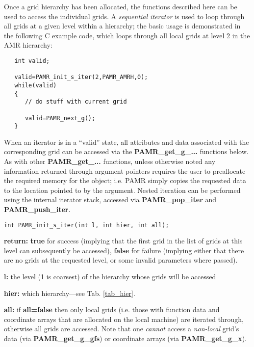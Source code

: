\documentclass[aps,amssymb,unsortedaddress,nofootinbib]{revtex4}
\def\lsep{\itemsep 0.05in}
\begin{document}
Once a grid hierarchy has been allocated, the functions described here can be used
to access the individual grids. A {\em sequential iterator} is used to loop
through all grids at a given level within a hierarchy; the basic usage is
demonstrated in the following C example code, which loops through all local grids
at level 2 in the AMR hierarchy:
\begin{verbatim}
   int valid;

   valid=PAMR_init_s_iter(2,PAMR_AMRH,0);
   while(valid)
   {
      // do stuff with current grid  
     
      valid=PAMR_next_g();
   }
\end{verbatim}
When an iterator is in a ``valid'' state, all attributes and data associated with the
corresponding grid can be accessed via the {\bf PAMR\_get\_g\_...} functions below.
As with other {\bf PAMR\_get\_...} functions, unless otherwise noted any
information returned through argument pointers requires the user to 
preallocate the required memory for the object; i.e. PAMR simply copies the
requested data to the location pointed to by the argument.
Nested iteration can be performed using the internal iterator stack, accessed
via {\bf PAMR\_pop\_iter} and {\bf PAMR\_push\_iter}.


\begin{verbatim}
int PAMR_init_s_iter(int l, int hier, int all);
\end{verbatim}
\begin{list}{}{\lsep}
\item {\bf return:} {\bf true} for success (implying that the first grid in the list
                    of grids at this level can subsequently be accessed), {\bf false} for failure 
                    (implying either that there are no grids at the requested
                    level, or some invalid parameters where passed).
\item {\bf l:} the level (1 is coarsest) of the hierarchy whose grids will be
               accessed 
\item {\bf hier:} which hierarchy---see Tab. \ref{tab_hier}.
\item {\bf all:} if {\bf all=false} then only local grids (i.e. those with function data
                 and coordinate arrays that are allocated on the local machine)
                 are iterated through, otherwise all grids are accessed. Note that 
                 one {\em cannot} access a {\em non-local} grid's data (via {\bf PAMR\_get\_g\_gfs})
                 or coordinate arrays (via {\bf PAMR\_get\_g\_x}).
\end{list}
\end{document}
